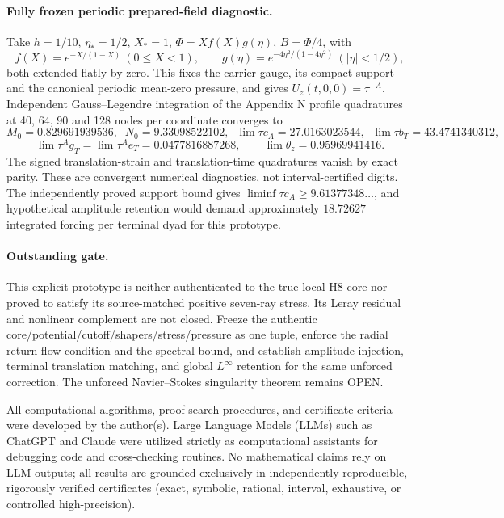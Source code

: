 \paragraph{Fully frozen periodic prepared-field diagnostic.}
Take $h=1/10$, $\eta_*=1/2$, $X_*=1$, $\Phi=Xf(X)g(\eta)$, $B=\Phi/4$, with
\[
f(X)=e^{-X/(1-X)}\ (0\le X<1),\qquad
g(\eta)=e^{-4\eta^2/(1-4\eta^2)}\ (|\eta|<1/2),
\]
both extended flatly by zero. This fixes the carrier gauge, its compact support and the canonical periodic mean-zero pressure, and gives $U_z(t,0,0)=\tau^{-A}$. Independent Gauss--Legendre integration of the Appendix N profile quadratures at 40, 64, 90 and 128 nodes per coordinate converges to
\[
M_0=0.829691939536,\;\;N_0=9.33098522102,\;\;
\lim\tau c_A=27.0163023544,\;\;\lim\tau b_T=43.4741340312,
\]
\[
\lim\tau^A g_T=\lim\tau^Ae_T=0.0477816887268,\qquad
\lim\theta_z=0.95969941416.
\]
The signed translation-strain and translation-time quadratures vanish by exact parity. These are convergent numerical diagnostics, not interval-certified digits. The independently proved support bound gives $\liminf\tau c_A\ge9.61377348\ldots$, and hypothetical amplitude retention would demand approximately $18.72627$ integrated forcing per terminal dyad for this prototype.
\paragraph{Outstanding gate.}
This explicit prototype is neither authenticated to the true local H8 core nor proved to satisfy its source-matched positive seven-ray stress. Its Leray residual and nonlinear complement are not closed. Freeze the authentic core/potential/cutoff/shapers/stress/pressure as one tuple, enforce the radial return-flow condition and the spectral bound, and establish amplitude injection, terminal translation matching, and global $L^\infty$ retention for the same unforced correction. The unforced Navier--Stokes singularity theorem remains OPEN.

\medskip\noindent All computational algorithms, proof-search procedures, and certificate criteria were developed by the author(s). Large Language Models (LLMs) such as ChatGPT and Claude were utilized strictly as computational assistants for debugging code and cross-checking routines. No mathematical claims rely on LLM outputs; all results are grounded exclusively in independently reproducible, rigorously verified certificates (exact, symbolic, rational, interval, exhaustive, or controlled high-precision).
